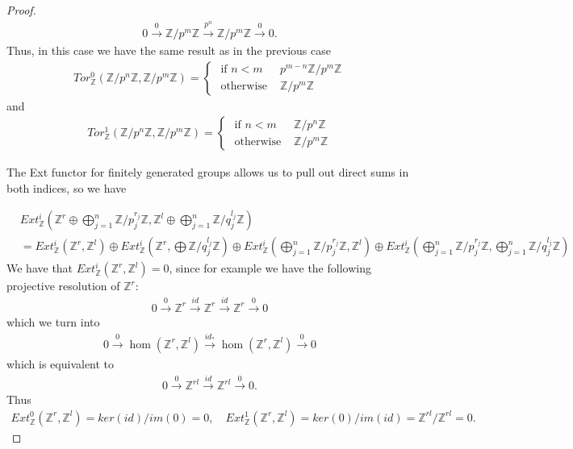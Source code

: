\documentclass[12pt]{extarticle}
\newcommand{\Z}{\mathbb{Z}}
\newcommand{\<}{\langle}
\renewcommand{\>}{\rangle}
\theoremstyle{definition}
\begin{document}
\begin{proof}
  \begin{align*}
    0 \xrightarrow{0} \Z/p^m\Z \xrightarrow{p^n} \Z/p^m\Z \xrightarrow{0} 0 .
  \end{align*}
  Thus, in this case we have the same result as in the previous case
  \begin{align*}
    Tor_{\Z}^0(\Z/p^n\Z, \Z/p^m\Z) =
    \begin{cases}
      \text{ if } n<m & p^{m-n}\Z/ p^m \Z \\
      \text{ otherwise } & \Z / p^m \Z
    \end{cases}
  \end{align*}
  and
  \begin{align*}
    Tor_{\Z}^1(\Z/p^n\Z, \Z/p^m\Z) =
    \begin{cases}
      \text{ if } n<m & \Z/ p^n \Z \\
      \text{ otherwise } & \Z / p^m \Z
    \end{cases}
  \end{align*}
  
  The Ext functor for finitely generated groups allows us to pull out direct sums in both indices, so we have

  \begin{align*}
    & Ext_{\Z}^i(\Z^r \oplus \bigoplus\limits_{j=1}^n \Z/p_j^{r_j}\Z, \Z^l
    \oplus \bigoplus\limits_{j=1}^n \Z/q_j^{l_j}\Z) \\
    &= Ext_{\Z}^i(\Z^r, \Z^l) \oplus Ext_{\Z}^i(\Z^r, \bigoplus \Z/q_j^{l_j}\Z) \oplus Ext_{\Z}^i(\bigoplus\limits_{j=1}^n \Z/p_j^{r_j}\Z, \Z^l) \oplus Ext_{\Z}^i(\bigoplus\limits_{j=1}^n \Z/p_j^{r_j}\Z,\bigoplus\limits_{j=1}^n \Z/q_j^{l_j}\Z)
  \end{align*}
  We have that $Ext_{\Z}^i(\Z^r, \Z^l) = 0$, since for example we have the following projective resolution of $\Z^r$:
  \begin{align*}
    0 \xrightarrow{0} \Z^r \xrightarrow{id} \Z^r \xrightarrow{id} \Z^r \xrightarrow{0} 0 
  \end{align*}
  which we turn into
  \begin{align*}
    0 \xrightarrow{0} \hom(\Z^r,\Z^l) \xrightarrow{id_*} \hom(\Z^r, \Z^l) \xrightarrow{0} 0     
  \end{align*}
  which is equivalent to 
  \begin{align*}
    0 \xrightarrow{0} \Z^{rl} \xrightarrow{id} \Z^{rl} \xrightarrow{0} 0.
  \end{align*}
  Thus 
  \begin{align*}
    Ext_{\Z}^0(\Z^r, \Z^l) = ker(id)/im(0) = 0, \quad Ext_{\Z}^1(\Z^r, \Z^l) = ker(0)/im(id) = \Z^{rl}/\Z^{rl} = 0.
  \end{align*}


\end{proof}
\end{document}
